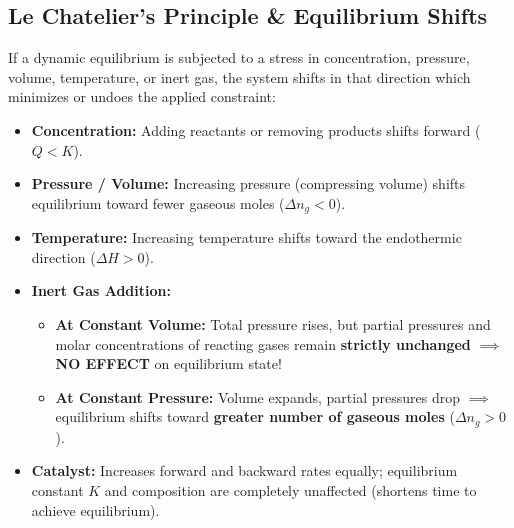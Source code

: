 \documentclass[10pt,a4paper]{article}
\begin{document}
\subsection{Le Chatelier's Principle \& Equilibrium Shifts}
If a dynamic equilibrium is subjected to a stress in concentration, pressure, volume, temperature, or inert gas, the system shifts in that direction which minimizes or undoes the applied constraint:
\begin{itemize}
  \item \textbf{Concentration:} Adding reactants or removing products shifts forward ($Q < K$).
  \item \textbf{Pressure / Volume:} Increasing pressure (compressing volume) shifts equilibrium toward fewer gaseous moles ($\Delta n_g < 0$).
  \item \textbf{Temperature:} Increasing temperature shifts toward the endothermic direction ($\Delta H > 0$).
  \item \textbf{Inert Gas Addition:}
  \begin{itemize}
    \item \textbf{At Constant Volume:} Total pressure rises, but partial pressures and molar concentrations of reacting gases remain \textbf{strictly unchanged} $\implies$ \textbf{NO EFFECT} on equilibrium state!
    \item \textbf{At Constant Pressure:} Volume expands, partial pressures drop $\implies$ equilibrium shifts toward \textbf{greater number of gaseous moles} ($\Delta n_g > 0$).
  \end{itemize}
  \item \textbf{Catalyst:} Increases forward and backward rates equally; equilibrium constant $K$ and composition are completely unaffected (shortens time to achieve equilibrium).
\end{itemize}
\end{document}
